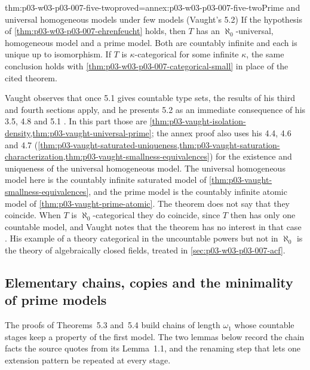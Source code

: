 \begin{hbtheorem}{thm:p03-w03-p03-007-five-two}{proved=annex:p03-w03-p03-007-five-two}{Prime and universal homogeneous models under few models (Vaught's 5.2)}
If the hypothesis of \cref{thm:p03-w03-p03-007-ehrenfeucht} holds, then
\(T\) has an \(\aleph_0\)-universal, homogeneous model and a prime model.
Both are countably infinite and each is unique up to isomorphism. If \(T\) is
\(\kappa\)-categorical for some infinite \(\kappa\), the same conclusion holds
with \cref{thm:p03-w03-p03-007-categorical-small} in place of the cited
theorem.
\end{hbtheorem}

Vaught observes that once 5.1 gives countable type sets, the results of his
third and fourth sections apply, and he presents 5.2 as an immediate
consequence of his 3.5, 4.8 and 5.1 \cite[p.~315]{Vaught1961}. In this part
those are \cref{thm:p03-vaught-isolation-density,thm:p03-vaught-universal-prime};
the annex proof also uses his 4.4, 4.6 and 4.7
(\cref{thm:p03-vaught-saturated-uniqueness,thm:p03-vaught-saturation-characterization,thm:p03-vaught-smallness-equivalences})
for the existence and uniqueness of the universal homogeneous model.
The universal homogeneous model here is the countably infinite saturated
model of \cref{thm:p03-vaught-smallness-equivalences}, and the prime model
is the countably infinite atomic model of \cref{thm:p03-vaught-prime-atomic}.
The theorem does not say that they coincide. When \(T\) is
\(\aleph_0\)-categorical they do coincide, since \(T\) then has only one
countable model, and Vaught notes that the theorem has no interest in that
case \cite[p.~316]{Vaught1961}. His example of a theory categorical in the
uncountable powers but not in \(\aleph_0\) is the theory of algebraically
closed fields, treated in \cref{sec:p03-w03-p03-007-acf}.

\subsection{Elementary chains, copies and the minimality of prime models}
\label{sec:p03-w03-p03-007-minimal}

The proofs of Theorems~5.3 and~5.4 build chains of length \(\omega_1\)
whose countable stages keep a property of the first model. The two lemmas
below record the chain facts the source quotes from its Lemma~1.1, and the
renaming step that lets one extension pattern be repeated at every stage.

